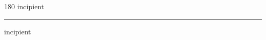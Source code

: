 
\begin{frame}
\begin{center}
\begin{turn}{180}
{\fontsize{2.5cm}{1em}\selectfont incipient}
\end{turn}
\vspace{1em}\par  
\hrule
\vspace{1em}\par  
{\fontsize{2.5cm}{1em}\selectfont incipient}
\end{center}
\end{frame}
